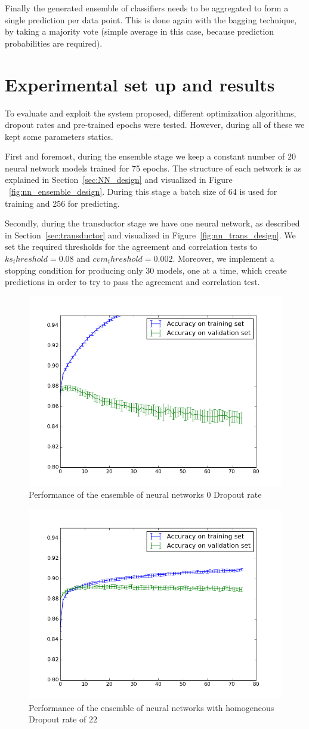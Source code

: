 \documentclass[conference]{IEEEtran}
\begin{document}
Finally the generated ensemble of classifiers needs to be aggregated to form a
single prediction per data point. This is done again with the bagging technique,
by taking a majority vote (simple average in this case, because prediction
probabilities are required).

\section{Experimental set up and results}
\label{sec:experiment}
To evaluate and exploit the system proposed, different optimization algorithms, dropout rates and pre-trained epochs were tested. However, during all of these we kept some parameters statics.

First and foremost, during the ensemble stage we keep a constant number of $20$ neural network models trained for 75 epochs. The structure of each network is as explained in Section~\ref{sec:NN_design} and visualized in Figure ~\ref{fig:nn_ensemble_design}. During this stage a batch size of 64 is used for training and 256 for predicting. 

Secondly, during the transductor stage we have one neural network, as described in Section~\ref{sec:transductor} and visualized in Figure~\ref{fig:nn_trans_design}. We set the required thresholds for the agreement and correlation tests to $ks_threshold = 0.08$ and $cvm_threshold=0.002$. Moreover, we implement a stopping condition for producing only $30$ models, one at a time, which create predictions in order to try to pass the agreement and correlation test. 

\begin{figure}[!ht]
	\centering
	\includegraphics[width=.5\textwidth]{../imgs/ensemble_stats_d0.png}
	\caption{Performance of the ensemble of neural networks $0$ Dropout rate}
	\label{fig:dropout_0}
\end{figure}

\begin{figure}[!ht]
	\centering
	\includegraphics[width=.5\textwidth]{../imgs/ensemble_stats_d22.png}
	\caption{Performance of the ensemble of neural networks with homogeneous Dropout rate of $22$}
	\label{fig:dropout_22}
\end{figure}
\end{document}
